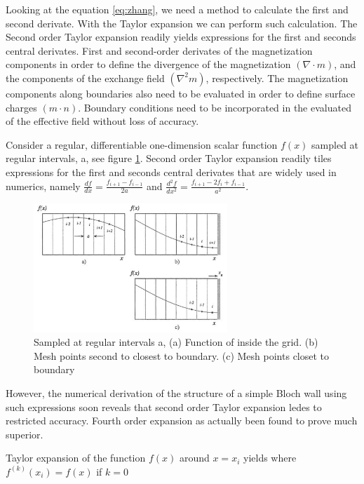 Looking at the equation \ref{eq:zhang}, we need a method to calculate the first and second derivate. With the Taylor expansion we can perform such calculation. The Second order Taylor expansion readily yields expressions for the first and seconds central derivates. First and second-order derivates of the magnetization components in order to define the divergence  of the magnetization $(\nabla \cdot m)$, and the components of the exchange field $(\nabla^2m)$, respectively. The magnetization components along boundaries also need to be evaluated in order to define surface charges $(m \cdot n)$. Boundary conditions need to be incorporated in the evaluated of the effective field without loss of accuracy. 

Consider a regular, differentiable one-dimension  scalar function $f(x)$ sampled at regular intervals, a, see figure  \ref{fig:bound}. Second order Taylor expansion readily tiles expressions for the first and seconds central derivates that are widely used in numerics, namely $\frac{df}{dx} = \frac{f_{i+1} - f_{i-1}}{2a}$ and $\frac{d^2f}{dx^2} = \frac{f_{i+1} - 2f_i + f_{i-1}}{a^2}$.

\begin{figure}[htbp]
	\centering
		\includegraphics[width=0.65\textwidth]{Figures/bound.png}
		\smallskip
	\caption[Sampled at regular intervals a, Taylor expansion]{Sampled at regular intervals a, (a) Function of inside the grid. (b) Mesh points second to closest to boundary. (c) Mesh points closet to boundary}
	\label{fig:bound}
\end{figure}

However, the numerical derivation of the structure of a simple Bloch wall using such expressions soon reveals that second order Taylor expansion ledes to restricted accuracy. Fourth order expansion as actually been found to prove much superior.  \cite{methods}

Taylor expansion of the function $f(x)$ around $x=x_i$ yields where $f^{(k)}(x_i) = f(x)$ if $k=0$

